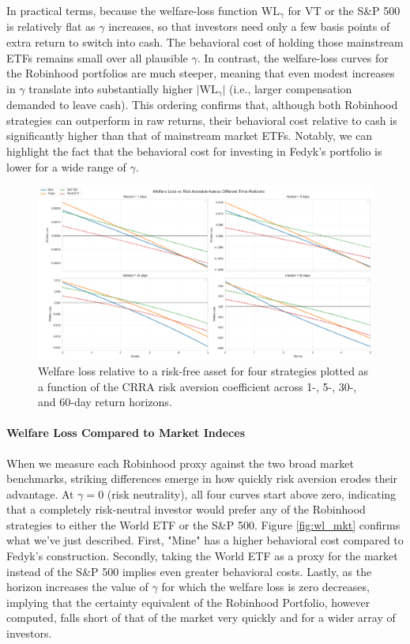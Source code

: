 In practical terms, because the welfare-loss function $\mathrm{WL}_\gamma$ for VT or the S\&P 500 is relatively flat as $\gamma$ increases, so that investors need only a few basis points of extra return to switch into cash. 
The behavioral cost of holding those mainstream ETFs remains small over all plausible $\gamma$. In contrast, the welfare-loss curves for the Robinhood portfolios are much steeper, 
meaning that even modest increases in $\gamma$ translate into substantially higher $\lvert\mathrm{WL}_\gamma\rvert$ (i.e., larger compensation demanded to leave cash). 
This ordering confirms that, although both Robinhood strategies can outperform in raw returns, their behavioral cost relative to cash is significantly higher than that of mainstream market ETFs.
Notably, we can highlight the fact that the behavioral cost for investing in Fedyk's portfolio is lower for a wide range of $\gamma$.
\begin{figure}[H]
    \centering
    \includegraphics[width=\linewidth]{../images/wl_rf.png}
    \caption{Welfare loss relative to a risk-free asset for four strategies plotted as a function of the CRRA risk aversion coefficient across 1-, 5-, 30-, and 60-day return horizons.}
\label{fig:wl_rf}
\end{figure}    



\paragraph{Welfare Loss Compared to Market Indeces}
When we measure each Robinhood proxy against the two broad market benchmarks, striking differences emerge in how quickly risk aversion erodes their advantage.  
At $\gamma=0$ (risk neutrality), all four curves start above zero, indicating that a completely risk-neutral investor would prefer any of the Robinhood strategies to either the World ETF or the S\&P 500.  
Figure \ref{fig:wl_mkt} confirms what we've just described.
First, "Mine" has a higher behavioral cost compared to Fedyk's construction.
Secondly, taking the World ETF as a proxy for the market instead of the S\&P 500 implies even greater behavioral costs.
Lastly, as the horizon increases the value of $\gamma$ for which the welfare loss is zero decreases, implying that the certainty equivalent of the Robinhood Portfolio, however computed, falls short of that of the market very quickly and for a wider array of investors.    

